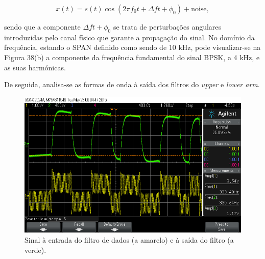 \documentclass[11pt]{article}
\numberwithin{equation}{section}
\begin{document}
\vspace{-3mm}
\begin{equation}
	x(t) = s(t)\cos(2\pi f_0t + \Delta ft + \phi_0) + \text{noise},
\end{equation} 

\vspace{1mm}
sendo que a componente $\Delta ft + \phi_0$ se trata de perturbações angulares introduzidas pelo canal físico que garante a propagação do sinal. No domínio da frequência, estando o SPAN definido como sendo de 10 kHz, pode visualizar-se na Figura 38(b) a componente da frequência fundamental do sinal BPSK, a 4 kHz, e as suas harmónicas.


De seguida, analisa-se as formas de onda à saída dos filtros do \textit{upper} e \textit{lower arm}.

\begin{figure}[H]
	\centering
	\includegraphics[keepaspectratio=true, scale=0.37]{exps/ineoutdofiltro}
	\caption{Sinal à entrada do filtro de dados (a amarelo) e à saída do filtro (a verde).}
	\vspace{-0.8em}
\end{figure}

\end{document}
